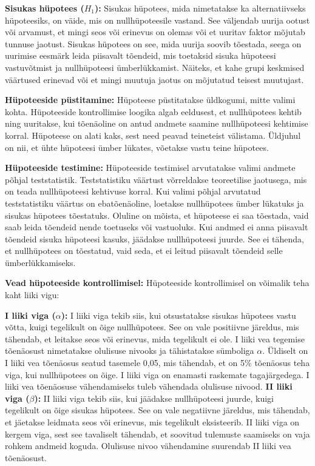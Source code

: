 \documentclass[
]{book}
\theoremstyle{definition}
\theoremstyle{definition}
\theoremstyle{definition}
\theoremstyle{definition}
\theoremstyle{remark}
\begin{document}
\textbf{Sisukas hüpotees (\(H_1\)):} Sisukas hüpotees, mida nimetatakse ka alternatiivseks hüpoteesiks, on väide, mis on nullhüpoteesile vastand. See väljendab uurija ootust või arvamust, et mingi seos või erinevus on olemas või et uuritav faktor mõjutab tunnuse jaotust. Sisukas hüpotees on see, mida uurija soovib tõestada, seega on uurimise eesmärk leida piisavalt tõendeid, mis toetaksid sisuka hüpoteesi vastuvõtmist ja nullhüpoteesi ümberlükkamist. Näiteks, et kahe grupi keskmised väärtused erinevad või et mingi muutuja jaotus on mõjutatud teisest muutujast.

\textbf{Hüpoteeside püstitamine:}
Hüpoteese püstitatakse üldkogumi, mitte valimi kohta. Hüpoteeside kontrollimise loogika algab eeldusest, et nullhüpotees kehtib ning uuritakse, kui tõenäoline on antud andmete saamine nullhüpoteesi kehtimise korral. Hüpoteese on alati kaks, sest need peavad teineteist välistama. Üldjuhul on nii, et ühte hüpoteesi ümber lükates, võetakse vastu teine hüpotees.

\textbf{Hüpoteeside testimine:}
Hüpoteeside testimisel arvutatakse valimi andmete põhjal teststatistik. Teststatistiku väärtust võrreldakse teoreetilise jaotusega, mis on teada nullhüpoteesi kehtivuse korral. Kui valimi põhjal arvutatud teststatistiku väärtus on ebatõenäoline, loetakse nullhüpotees ümber lükatuks ja sisukas hüpotees tõestatuks. Oluline on mõista, et hüpoteese ei saa tõestada, vaid saab leida tõendeid nende toetuseks või vastuoluks. Kui andmed ei anna piisavalt tõendeid sisuka hüpoteesi kasuks, jäädakse nullhüpoteesi juurde. See ei tähenda, et nullhüpotees on tõestatud, vaid seda, et ei leitud piisavalt tõendeid selle ümberlükkamiseks.

\textbf{Vead hüpoteeside kontrollimisel:}
Hüpoteeside kontrollimisel on võimalik teha kaht liiki vigu:

\textbf{I liiki viga (\(\alpha\)):} I liiki viga tekib siis, kui otsustatakse sisukas hüpotees vastu võtta, kuigi tegelikult on õige nullhüpotees. See on vale positiivne järeldus, mis tähendab, et leitakse seos või erinevus, mida tegelikult ei ole. I liiki vea tegemise tõenäosust nimetatakse olulisuse nivooks ja tähistatakse sümboliga \(\alpha\). Üldiselt on I liiki vea tõenäosus seatud tasemele 0,05, mis tähendab, et on 5\% tõenäosus teha viga, kui nullhüpotees on õige. I liiki viga on enamasti raskemate tagajärgedega. I liiki vea tõenäosuse vähendamiseks tuleb vähendada olulisuse nivood.
\textbf{II liiki viga (\(\beta\)):} II liiki viga tekib siis, kui jäädakse nullhüpoteesi juurde, kuigi tegelikult on õige sisukas hüpotees. See on vale negatiivne järeldus, mis tähendab, et jäetakse leidmata seos või erinevus, mis tegelikult eksisteerib. II liiki viga on kergem viga, sest see tavaliselt tähendab, et soovitud tulemuste saamiseks on vaja rohkem andmeid koguda. Olulisuse nivoo vähendamine suurendab II liiki vea tõenäosust.
\end{document}
